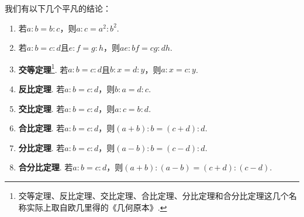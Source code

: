我们有以下几个平凡的结论：\begin{enumerate}
\item 若\(a:b = b:c\)，则\(a:c = a^2:b^2\).
\item 若\(a:b = c:d\)且\(e:f = g:h\)，则\(ae:bf = cg:dh\).
\item \textbf{交等定理}\footnote{%
交等定理、反比定理、交比定理、合比定理、分比定理和合分比定理这几个名称实际上取自欧几里得的《几何原本》.%
}.
若\(a:b = c:d\)且\(b:x = d:y\)，则\(a:x = c:y\).
\item \textbf{反比定理}.
若\(a:b = c:d\)，则\(b:a = d:c\).
\item \textbf{交比定理}.
若\(a:b = c:d\)，则\(a:c = b:d\).
\item \textbf{合比定理}.
若\(a:b = c:d\)，则\((a+b):b = (c+d):d\).
\item \textbf{分比定理}.
若\(a:b = c:d\)，则\((a-b):b = (c-d):d\).
\item \textbf{合分比定理}.
若\(a:b = c:d\)，则\((a+b):(a-b) = (c+d):(c-d)\).
\end{enumerate}
